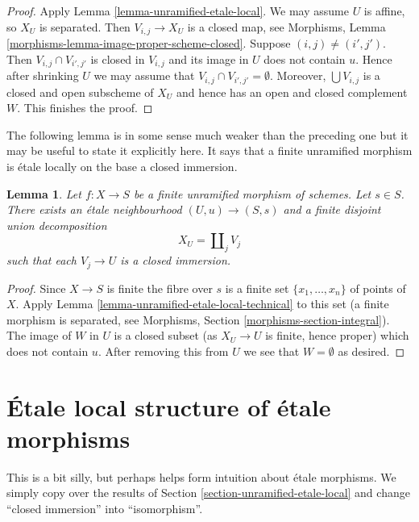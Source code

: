 \documentclass{stacks-project}
\theoremstyle{plain}
\newtheorem{lemma}[subsection]{Lemma}
\theoremstyle{definition}
\theoremstyle{remark}
\numberwithin{equation}{subsection}
\begin{document}
\begin{proof}
Apply
Lemma \ref{lemma-unramified-etale-local}.
We may assume $U$ is affine, so $X_U$ is separated.
Then $V_{i, j} \to X_U$ is a closed map, see
Morphisms, Lemma \ref{morphisms-lemma-image-proper-scheme-closed}.
Suppose $(i, j) \not = (i', j')$.
Then $V_{i, j} \cap V_{i', j'}$ is closed in $V_{i, j}$ and
its image in $U$ does not contain $u$.
Hence after shrinking $U$ we may assume that
$V_{i, j} \cap V_{i', j'} = \emptyset$. Moreover, $\bigcup V_{i, j}$ is
a closed and open subscheme of $X_U$ and hence has an open and closed
complement $W$. This finishes the proof.
\end{proof}

\noindent
The following lemma is in some sense much weaker than the preceding one
but it may be useful to state it explicitly here. It says that a finite
unramified morphism is \'etale locally on the base a closed immersion.

\begin{lemma}
\label{lemma-finite-unramified-etale-local}
Let $f : X \to S$ be a finite unramified morphism of schemes.
Let $s \in S$.
There exists an \'etale neighbourhood $(U, u) \to (S, s)$
and a finite disjoint union decomposition
$$
X_U = \coprod\nolimits_j V_j
$$
such that each $V_j \to U$ is a closed immersion.
\end{lemma}

\begin{proof}
Since $X \to S$ is finite the fibre over $s$ is a finite set
$\{x_1, \ldots, x_n\}$ of points of $X$. Apply
Lemma \ref{lemma-unramified-etale-local-technical}
to this set (a finite morphism is separated, see
Morphisms, Section \ref{morphisms-section-integral}).
The image of $W$ in $U$ is a closed
subset (as $X_U \to U$ is finite, hence proper) which does not
contain $u$. After removing this from $U$ we see that $W = \emptyset$
as desired.
\end{proof}




\section{\'Etale local structure of \'etale morphisms}
\label{section-etale-local-etale}

\noindent
This is a bit silly, but perhaps helps form intuition about \'etale
morphisms. We simply copy over the results of
Section \ref{section-unramified-etale-local}
and change ``closed immersion'' into ``isomorphism''.
\end{document}

